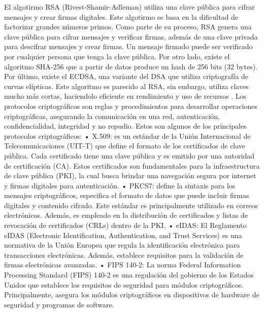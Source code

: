 \documentclass{amsart}
\begin{document}
    El algotirmo RSA (Rivest-Shamir-Adleman) utiliza una clave pública para cifrar mensajes y crear firmas digitales. Este algotirmo se basa en la dificultad de factorizar grandes números primos. Como parte de su proceso, RSA genera una clave pública para cifrar mensajes y verificar firmas, además de una clave privada para descifrar mensajes y crear firmas. Un mensaje firmado puede ser verificado por cualquier persona que tenga la clave pública. Por otro lado, existe el algoritmo SHA-256 que a partir de datos produce un hash de 256 bits (32 bytes). Por último, existe el ECDSA, una variante del DSA que utiliza criptografía de curvas elípticas. Este algoritmo es parecido al RSA, sin embargo, utiliza claves mucho más cortas, haciendolo eficiente en rendimiento y uso de recursos \parencite{Hernandez}.
    Los protocolos criptográficos son reglas y procedimientos para desarrollar operaciones criptográficas, asegurando la comunicación en una red, autenticación, confidencialidad, integridad y no repudio. Estos son algunos de los principales protocolos criptográficos:
        •	X.509: es un estándar de la Unión Internacional de Telecomunicaciones (UIT-T) que define el formato de los certificados de clave pública. Cada certificado tiene una clave pública y es emitido por una autoridad de certificación (CA). Estos certificados son fundamentales para la infraestructura de clave pública (PKI), la cual busca brindar una navegación segura por internet y firmas digitales para autenticación.
        •	PKCS7: define la sintaxis para los mensajes criptográficos, especifica el formato de datos que puede incluir firmas digitales y contenido cifrado. Este estándar es principalmente utilizado en correos electrónicos. Además, es empleado en la distribución de certificados y listas de revocación de certificados (CRLs) dentro de la PKI.
        •	eIDAS: El Reglamento eIDAS (Electronic Identification, Authentication, and Trust Services) es una normativa de la Unión Europea que regula la identificación electrónica para transacciones electrónicas. Además, establece requisitos para la validación de firmas electrónicas avanzadas.
        •	FIPS 140-2: La norma Federal Information Processing Standard (FIPS) 140-2 es una regulación del gobierno de los Estados Unidos que establece los requisitos de seguridad para módulos criptográficos. Principalmente, asegura los módulos criptográficos en dispositivos de hardware de seguridad y programas de software.
        \parencite{cryptography}
        
\end{document}
